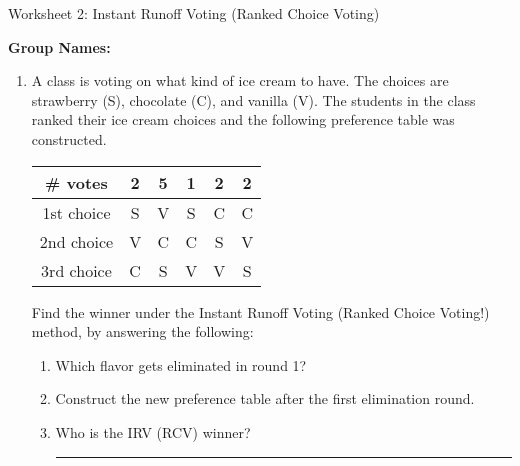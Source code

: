\documentclass[12pt]{article}
\newcommand{\ans}[1][1in]{\rule{#1}{.5pt}}
\begin{document}
\begin{center}
{\Large  Worksheet 2:  Instant Runoff Voting (Ranked Choice Voting)	 	}
\end{center}



\noindent \textbf{Group Names:} \hrulefill \\
\begin{enumerate}     

\item A class is voting on what kind of ice cream to have. The choices are strawberry (S), chocolate (C), and vanilla (V). The students in the class ranked their ice cream choices and the following preference table was constructed. %




\begingroup %
\renewcommand{\arraystretch}{2} %
    \begin{tabular}{| c  | c | c  | c  | c| c |} \hline
    \# votes & 2 & 5 & 1& 2 & 2\\ \hline \hline
1st choice & S& V& S &C& C\\ \hline
2nd choice &  V &C &  C & S&V\\ \hline
3rd choice & C & S& V & V & S\\ \hline
\end{tabular}
\endgroup 



Find the winner under the Instant Runoff Voting (Ranked Choice Voting!) method, by answering the following:

\begin{enumerate}
\item Which flavor gets eliminated in round 1? \hrulefill
\vspace{1 cm}
\item Construct the new preference table after the first elimination round.
\vfill
\item Who is the IRV (RCV) winner? \ans
\vspace{1in}


\end{enumerate}
\end{enumerate}
\end{document}

